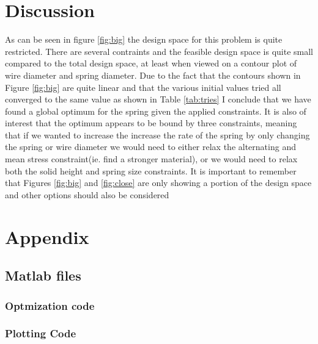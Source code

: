 \documentclass{article}
\begin{document}
\section{Discussion}
As can be seen in figure \ref{fig:big} the design space for this problem is quite restricted.  There are several contraints and the feasible design space is quite small compared to the total design space, at least when viewed on a contour plot of wire diameter and spring diameter.  Due to the fact that the contours shown in Figure \ref{fig:big} are quite linear and that the various initial values tried all converged to the same value as shown in Table \ref{tab:tries} I conclude that we have found a global optimum for the spring given the applied constraints.  It is also of interest that the optimum appears to be bound by three constraints, meaning that if we wanted to increase the increase the rate of the spring by only changing the spring or wire diameter we would need to either relax the alternating and mean stress constraint(ie. find a stronger material), or we would need to relax both the solid height and spring size constraints.  It is important to remember that Figures \ref{fig:big} and \ref{fig:close} are only showing a portion of the design space and other options should also be considered


\section{Appendix}

\subsection{Matlab files}
\subsubsection{Optmization code}
\subsubsection{Plotting Code}
\end{document}
